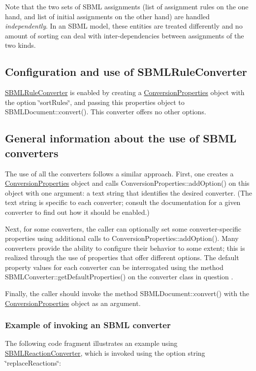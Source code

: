 Note that the two sets of S\+B\+ML assignments (list of assignment rules on the one hand, and list of initial assignments on the other hand) are handled {\itshape independently}. In an S\+B\+ML model, these entities are treated differently and no amount of sorting can deal with inter-\/dependencies between assignments of the two kinds.\hypertarget{class_s_b_m_l_rule_converter_SBMLRuleConverter-usage}{}\subsection{Configuration and use of S\+B\+M\+L\+Rule\+Converter}\label{class_s_b_m_l_rule_converter_SBMLRuleConverter-usage}
\hyperlink{class_s_b_m_l_rule_converter}{S\+B\+M\+L\+Rule\+Converter} is enabled by creating a \hyperlink{class_conversion_properties}{Conversion\+Properties} object with the option {\ttfamily \char`\"{}sort\+Rules\char`\"{}}, and passing this properties object to S\+B\+M\+L\+Document\+::convert(). This converter offers no other options.\hypertarget{classdoc__section__using__sbml__converters_using-converters}{}\subsection{General information about the use of S\+B\+M\+L converters}\label{classdoc__section__using__sbml__converters_using-converters}
The use of all the converters follows a similar approach. First, one creates a \hyperlink{class_conversion_properties}{Conversion\+Properties} object and calls Conversion\+Properties\+::add\+Option() on this object with one argument\+: a text string that identifies the desired converter. (The text string is specific to each converter; consult the documentation for a given converter to find out how it should be enabled.)

Next, for some converters, the caller can optionally set some converter-\/specific properties using additional calls to Conversion\+Properties\+::add\+Option(). Many converters provide the ability to configure their behavior to some extent; this is realized through the use of properties that offer different options. The default property values for each converter can be interrogated using the method S\+B\+M\+L\+Converter\+::get\+Default\+Properties() on the converter class in question .

Finally, the caller should invoke the method S\+B\+M\+L\+Document\+::convert() with the \hyperlink{class_conversion_properties}{Conversion\+Properties} object as an argument.\hypertarget{classdoc__section__using__sbml__converters_converter-example}{}\subsubsection{Example of invoking an S\+B\+M\+L converter}\label{classdoc__section__using__sbml__converters_converter-example}
The following code fragment illustrates an example using \hyperlink{class_s_b_m_l_reaction_converter}{S\+B\+M\+L\+Reaction\+Converter}, which is invoked using the option string {\ttfamily \char`\"{}replace\+Reactions\char`\"{}}\+:

